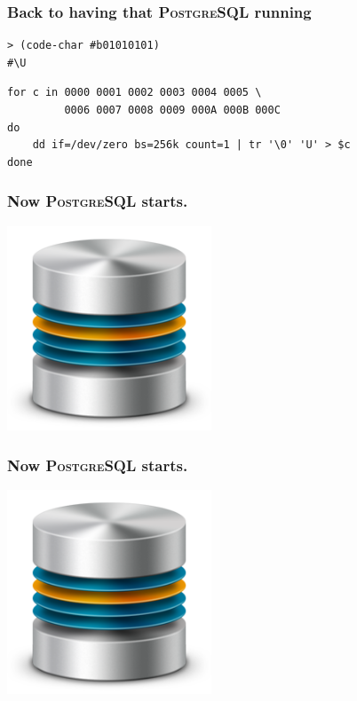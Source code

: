 \documentclass{beamer}
\begin{document}
\begin{frame}[fragile]
  \frametitle{Back to having that \textsc{PostgreSQL} running}

  \vfill

\begin{verbatim}
> (code-char #b01010101)
#\U
\end{verbatim}

\vfill
\begin{verbatim}
for c in 0000 0001 0002 0003 0004 0005 \
         0006 0007 0008 0009 000A 000B 000C
do
    dd if=/dev/zero bs=256k count=1 | tr '\0' 'U' > $c
done
\end{verbatim}
\end{frame}

\begin{frame}
  \frametitle{Now \textsc{PostgreSQL} starts.}

  \vfill
  
  \begin{center}
    \includegraphics[height=2.4in]{LRN-LNP-database.png}
  \end{center}
\end{frame}

\begin{frame}
  \frametitle{Now \textsc{PostgreSQL} starts.}

  \vfill
  
  \begin{center}
    \includegraphics[height=2.4in]{LRN-LNP-database.png}
  \end{center}
\end{frame}
\end{document}
